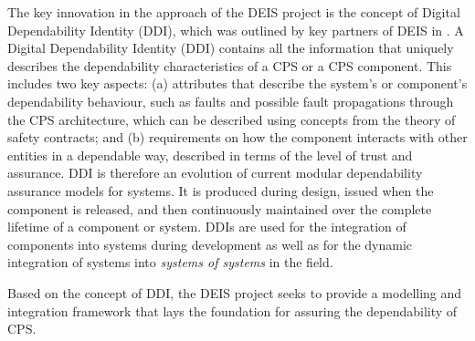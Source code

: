 The key innovation in the approach of the DEIS project is the concept of Digital Dependability Identity (DDI), which was outlined by key partners of DEIS in \cite{Schneider2015}. 
A Digital Dependability Identity (DDI) contains all the information that uniquely describes the dependability characteristics of a CPS or a CPS component. This includes two key aspects: (a) attributes that describe the system’s or component’s dependability behaviour, such as faults and possible fault propagations through the CPS architecture, which can be described using concepts from the theory of safety contracts; and (b) requirements on how the component interacts with other entities in a dependable way, described in terms of the level of trust and assurance.
DDI is therefore an evolution of current modular dependability assurance models for systems. It is produced during design, issued when the component is released, and then continuously maintained over the complete lifetime of a component or system. DDIs are used for the integration of components into systems during development as well as for the dynamic integration of systems into \emph{systems of systems} in the field. 

Based on the concept of DDI, the DEIS project seeks to provide a modelling and integration framework that lays the foundation for assuring the dependability of CPS. 







